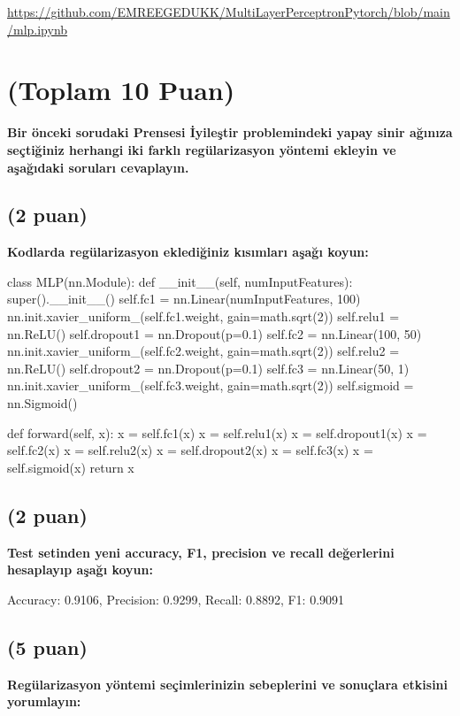 \documentclass[11pt]{article}
\begin{document}
\url{https://github.com/EMREEGEDUKK/MultiLayerPerceptronPytorch/blob/main/mlp.ipynb}


\section{(Toplam 10 Puan)} \textbf{Bir önceki sorudaki Prensesi İyileştir problemindeki yapay sinir ağınıza seçtiğiniz herhangi iki farklı regülarizasyon yöntemi ekleyin ve aşağıdaki soruları cevaplayın.} 

\subsection{(2 puan)} \textbf{Kodlarda regülarizasyon eklediğiniz kısımları aşağı koyun:} 

\begin{python}
class MLP(nn.Module):
    def __init__(self, numInputFeatures):
        super().__init__()
        self.fc1 = nn.Linear(numInputFeatures, 100) 
        nn.init.xavier_uniform_(self.fc1.weight, gain=math.sqrt(2))
        self.relu1 = nn.ReLU() 
        self.dropout1 = nn.Dropout(p=0.1) 
        self.fc2 = nn.Linear(100, 50)
        nn.init.xavier_uniform_(self.fc2.weight, gain=math.sqrt(2))
        self.relu2 = nn.ReLU() 
        self.dropout2 = nn.Dropout(p=0.1) 
        self.fc3 = nn.Linear(50, 1) 
        nn.init.xavier_uniform_(self.fc3.weight, gain=math.sqrt(2))
        self.sigmoid = nn.Sigmoid() 
        
    def forward(self, x):
        x = self.fc1(x)
        x = self.relu1(x)
        x = self.dropout1(x)
        x = self.fc2(x)
        x = self.relu2(x)
        x = self.dropout2(x)
        x = self.fc3(x)
        x = self.sigmoid(x)
        return x
\end{python}

\subsection{(2 puan)} \textbf{Test setinden yeni accuracy, F1, precision ve recall değerlerini hesaplayıp aşağı koyun:}

Accuracy: 0.9106, Precision: 0.9299, Recall: 0.8892, F1: 0.9091

\subsection{(5 puan)} \textbf{Regülarizasyon yöntemi seçimlerinizin sebeplerini ve sonuçlara etkisini yorumlayın:}
\end{document}
